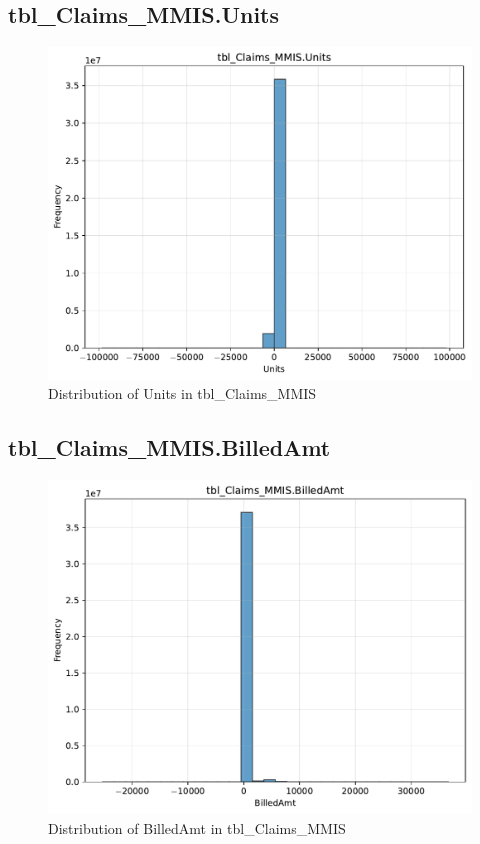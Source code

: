 \subsection{tbl\_Claims\_MMIS.Units}

\begin{figure}[htbp]
\centering
\includegraphics[width=\textwidth]{figures/dbo_tbl_Claims_MMIS_Units.pdf}
\caption{Distribution of Units in tbl\_Claims\_MMIS}
\end{figure}\newpage

\subsection{tbl\_Claims\_MMIS.BilledAmt}

\begin{figure}[htbp]
\centering
\includegraphics[width=\textwidth]{figures/dbo_tbl_Claims_MMIS_BilledAmt.pdf}
\caption{Distribution of BilledAmt in tbl\_Claims\_MMIS}
\end{figure}\newpage

